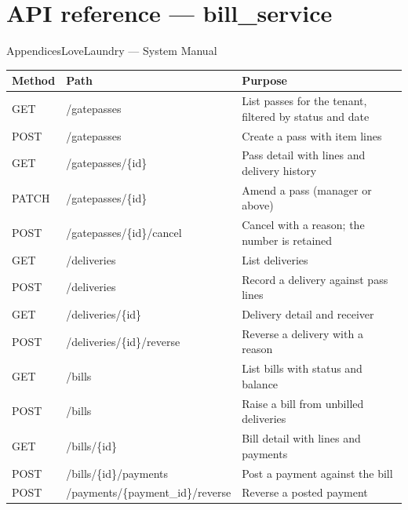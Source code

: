 \documentclass[11pt,a4paper,oneside]{book}
\begin{document}
\section*{API reference — bill\_service}
AppendicesLoveLaundry — System Manual

\begin{center}\small
\begin{tabularx}{\linewidth}{|X|X|X|}
\hline
\rowcolor{lightgrey}
\textbf{Method} & \textbf{Path} & \textbf{Purpose} \\ \hline
GET & /gatepasses & List passes for the tenant, filtered by status and date \\ \hline
POST & /gatepasses & Create a pass with item lines \\ \hline
GET & /gatepasses/\{id\} & Pass detail with lines and delivery history \\ \hline
PATCH & /gatepasses/\{id\} & Amend a pass (manager or above) \\ \hline
POST & /gatepasses/\{id\}/cancel & Cancel with a reason; the number is retained \\ \hline
GET & /deliveries & List deliveries \\ \hline
POST & /deliveries & Record a delivery against pass lines \\ \hline
GET & /deliveries/\{id\} & Delivery detail and receiver \\ \hline
POST & /deliveries/\{id\}/reverse & Reverse a delivery with a reason \\ \hline
GET & /bills & List bills with status and balance \\ \hline
POST & /bills & Raise a bill from unbilled deliveries \\ \hline
GET & /bills/\{id\} & Bill detail with lines and payments \\ \hline
POST & /bills/\{id\}/payments & Post a payment against the bill \\ \hline
POST & /payments/\{payment\_id\}/reverse & Reverse a posted payment \\ \hline
\end{tabularx}
\end{center}
\end{document}
